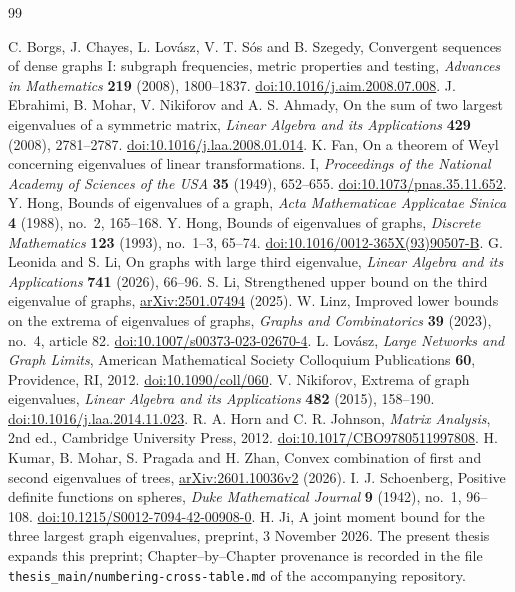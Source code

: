 \begin{thebibliography}{99}
\singlespacing\footnotesize
\raggedright

C. Borgs, J. Chayes, L. Lov\'asz, V. T. S\'os and B. Szegedy,
Convergent sequences of dense graphs I: subgraph frequencies, metric
properties and testing,
\emph{Advances in Mathematics} \textbf{219} (2008), 1800--1837.
\href{https://doi.org/10.1016/j.aim.2008.07.008}{doi:10.1016/j.aim.2008.07.008}.
J. Ebrahimi, B. Mohar, V. Nikiforov and A. S. Ahmady,
On the sum of two largest eigenvalues of a symmetric matrix,
\emph{Linear Algebra and its Applications} \textbf{429} (2008), 2781--2787.
\href{https://doi.org/10.1016/j.laa.2008.01.014}{doi:10.1016/j.laa.2008.01.014}.
K. Fan,
On a theorem of Weyl concerning eigenvalues of linear transformations. I,
\emph{Proceedings of the National Academy of Sciences of the USA}
\textbf{35} (1949), 652--655.
\href{https://doi.org/10.1073/pnas.35.11.652}{doi:10.1073/pnas.35.11.652}.
Y. Hong,
Bounds of eigenvalues of a graph,
\emph{Acta Mathematicae Applicatae Sinica} \textbf{4} (1988), no.~2, 165--168.
Y. Hong,
Bounds of eigenvalues of graphs,
\emph{Discrete Mathematics} \textbf{123} (1993), no.~1--3, 65--74.
\href{https://doi.org/10.1016/0012-365X(93)90507-B}{doi:10.1016/0012-365X(93)90507-B}.
G. Leonida and S. Li,
On graphs with large third eigenvalue,
\emph{Linear Algebra and its Applications} \textbf{741} (2026), 66--96.
S. Li,
Strengthened upper bound on the third eigenvalue of graphs,
\href{https://arxiv.org/abs/2501.07494}{arXiv:2501.07494} (2025).
W. Linz,
Improved lower bounds on the extrema of eigenvalues of graphs,
\emph{Graphs and Combinatorics} \textbf{39} (2023), no.~4, article 82.
\href{https://doi.org/10.1007/s00373-023-02670-4}{doi:10.1007/s00373-023-02670-4}.
L. Lov\'asz,
\emph{Large Networks and Graph Limits},
American Mathematical Society Colloquium Publications \textbf{60},
Providence, RI, 2012.
\href{https://doi.org/10.1090/coll/060}{doi:10.1090/coll/060}.
V. Nikiforov,
Extrema of graph eigenvalues,
\emph{Linear Algebra and its Applications} \textbf{482} (2015), 158--190.
\href{https://doi.org/10.1016/j.laa.2014.11.023}{doi:10.1016/j.laa.2014.11.023}.
R. A. Horn and C. R. Johnson,
\emph{Matrix Analysis}, 2nd ed., Cambridge University Press, 2012.
\href{https://doi.org/10.1017/CBO9780511997808}{doi:10.1017/CBO9780511997808}.
H. Kumar, B. Mohar, S. Pragada and H. Zhan,
Convex combination of first and second eigenvalues of trees,
\href{https://arxiv.org/abs/2601.10036v2}{arXiv:2601.10036v2} (2026).
I. J. Schoenberg,
Positive definite functions on spheres,
\emph{Duke Mathematical Journal} \textbf{9} (1942), no.~1, 96--108.
\href{https://doi.org/10.1215/S0012-7094-42-00908-0}{doi:10.1215/S0012-7094-42-00908-0}.
H. Ji,
A joint moment bound for the three largest graph eigenvalues,
preprint, 3 November 2026. The present thesis expands this preprint;
Chapter--by--Chapter provenance is recorded in the file
\texttt{thesis\_main/numbering-cross-table.md} of the accompanying repository.
\end{thebibliography}

